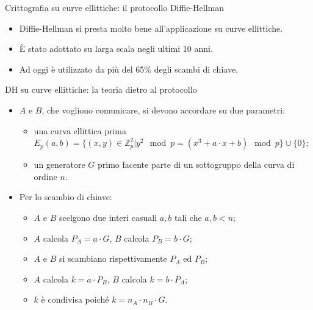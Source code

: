 \documentclass[11pt,svgnames,smaller,aspectratio=169,italian]{beamer}
\begin{document}
\begin{frame}{Crittografia su curve ellittiche: il protocollo Diffie-Hellman}
	\begin{itemize}
		\item Diffie-Hellman si presta molto bene all'applicazione su curve ellittiche.
		\item È stato adottato su larga scala negli ultimi 10 anni.
		\item Ad oggi è utilizzato da più del 65\% degli scambi di chiave.
	\end{itemize}
\end{frame}

\begin{frame}{DH su curve ellittiche: la teoria dietro al protocollo}
	\begin{itemize}
		\item $A$ e $B$, che vogliono comunicare, si devono accordare su due parametri:
			\begin{itemize}
				\item una curva ellittica prima $E_{p}(a, b) = \{(x, y) \in \mathds{Z}_{p}^{2} | y^{2} \mod p = (x^{3} + a \cdot x + b) \mod p \} \cup \{0\}$;
				\item un generatore $G$ primo facente parte di un sottogruppo della curva di ordine $n$.
			\end{itemize}
		\item Per lo scambio di chiave:
			\begin{itemize}
				\item $A$ e $B$ scelgono due interi casuali $a, b$ tali che $a, b < n$;
				\item $A$ calcola $P_{A} = a \cdot G$, $B$ calcola $P_{B} = b \cdot G$;
				\item $A$ e $B$ si scambiano rispettivamente $P_{A}$ ed $P_{B}$;
				\item $A$ calcola $k = a \cdot P_{B}$, $B$ calcola $k = b \cdot P_{A}$;
				\item $k$ è condivisa poiché $k = n_{A} \cdot n_{B} \cdot G$.
			\end{itemize}
	\end{itemize}
\end{frame}
\end{document}
